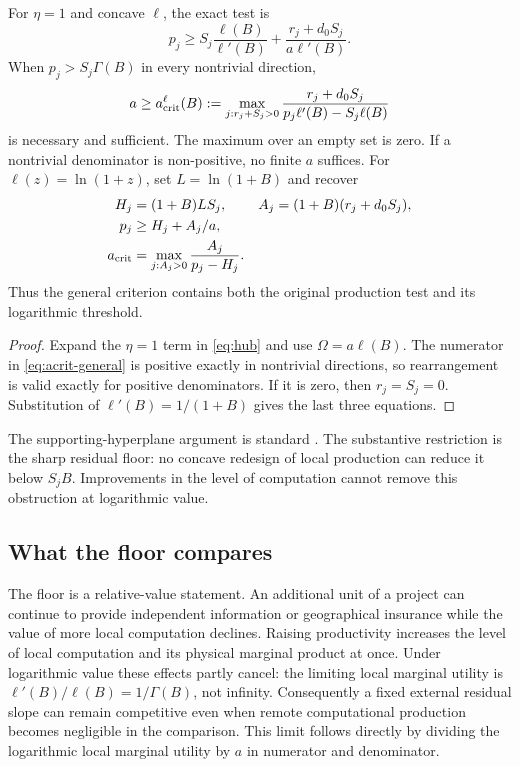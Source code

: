\begin{corollary}
\label{lem:production}
\label{prop:threshold}
For $\eta=1$ and concave $\ell$, the exact test is
\begin{equation}
 p_j\geq S_j\frac{\ell(B)}{\ell'(B)}
       +\frac{r_j+d_0S_j}{a\ell'(B)}.
 \label{eq:general-production}
\end{equation}
When $p_j>S_j\Gamma(B)$ in every nontrivial direction,
\begin{equation}
 a\geq a_{\rm crit}^{\ell}(B):=
 \max_{j:r_j+S_j>0}
 \frac{r_j+d_0S_j}{p_j\ell'(B)-S_j\ell(B)}
 \label{eq:acrit-general}
\end{equation}
is necessary and sufficient. The maximum over an empty set is zero.
If a nontrivial denominator is non-positive, no finite $a$ suffices.
For $\ell(z)=\ln(1+z)$, set $L=\ln(1+B)$ and recover
\begin{align}
 H_j&=(1+B)LS_j,& A_j&=(1+B)(r_j+d_0S_j),\label{eq:HA}\\
 p_j&\geq H_j+A_j/a,\label{eq:exact}\\
 a_{\rm crit}&=\max_{j:A_j>0}\frac{A_j}{p_j-H_j}.
 \label{eq:acrit}
\end{align}
Thus the general criterion contains both the original production test
and its logarithmic threshold.
\end{corollary}
\begin{proof}
Expand the $\eta=1$ term in \cref{eq:hub} and use
$\Omega=a\ell(B)$. The numerator in \cref{eq:acrit-general} is
positive exactly in nontrivial directions, so rearrangement is valid
exactly for positive denominators. If it is zero, then $r_j=S_j=0$.
Substitution of $\ell'(B)=1/(1+B)$ gives the last three equations.
\end{proof}

The supporting-hyperplane argument is standard
\citep[chapters 3--5]{BoydVandenberghe2004}. The substantive restriction
is the sharp residual floor: no concave redesign of local production
can reduce it below $S_jB$. Improvements in the level of computation
cannot remove this obstruction at logarithmic value.


\subsection{What the floor compares}
The floor is a relative-value statement. An additional unit of a project
can continue to provide independent information or geographical insurance
while the value of more local computation declines. Raising productivity
increases the level of local computation and its physical marginal product
at once. Under logarithmic value these effects partly cancel: the limiting
local marginal utility is $\ell'(B)/\ell(B)=1/\Gamma(B)$, not infinity.
Consequently a fixed external residual slope can remain competitive even
when remote computational production becomes negligible in the comparison.
This limit follows directly by dividing the logarithmic local marginal
utility by $a$ in numerator and denominator.

